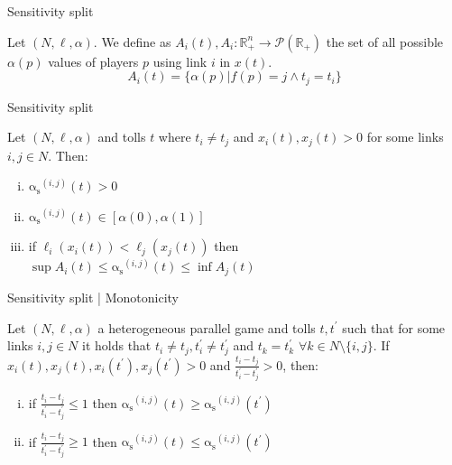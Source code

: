 \documentclass{beamer}
\newcommand{\as}{\mathrm{\alpha_s}}
\newcommand{\R}{\mathbb{R}}
\begin{document}
\begin{frame}{Sensitivity split}
	\begin{definition}
		\label{definition:alpha_flow_sets}
		Let $(N, \ell, \alpha)$.
		We define as $A_i(t), A_i: \R_+^n \rightarrow \mathcal{P}(\R_+)$ the set of all possible $\alpha(p)$ values of players $p$ using link $i$ in $x(t)$.
		\[A_i(t) = \{\alpha(p) | f(p) = j \wedge t_j = t_i\}\]
	\end{definition}
\end{frame}

\begin{frame}{Sensitivity split}
	\begin{lemma}
		Let $(N, \ell, \alpha)$ and tolls $t$ where $t_i \ne t_j$ and $x_i(t), x_j(t) > 0$ for some links $i, j \in N$.
		Then:
		\begin{enumerate}[(i)]
			\item $\as^{(i, j)}(t) > 0$
			\item $\as^{(i, j)}(t) \in [\alpha(0), \alpha(1)]$
			\item if $\ell_i(x_i(t)) < \ell_j(x_j(t))$ then
			$\sup A_i(t) \le \as^{(i, j)}(t) \le \inf A_j(t)$
		\end{enumerate}
	\end{lemma}
\end{frame}

\begin{frame}{Sensitivity split | Monotonicity}
	\begin{lemma}
		Let $(N, \ell, \alpha)$ a heterogeneous parallel game and tolls $t, t^\prime$ such that for some links $i, j \in N$ it holds that $t_i \ne t_j, t_i^\prime \ne t_j^\prime$ and $t_k = t_k^\prime$ $\forall k \in N \setminus \{i, j\}$.
		If $x_i(t), x_j(t), x_i(t^\prime), x_j(t^\prime) > 0$ and $\frac{t_i - t_j}{t_i^\prime - t_j^\prime} > 0$, then:
		\begin{enumerate}[(i)]
			\item if $\frac{t_i - t_j}{t_i^\prime - t_j^\prime} \le 1$ then $\as^{(i, j)}(t) \ge \as^{(i, j)}(t^\prime)$
			\item if $\frac{t_i - t_j}{t_i^\prime - t_j^\prime} \ge 1$ then $\as^{(i, j)}(t) \le \as^{(i, j)}(t^\prime)$
		\end{enumerate}
	\end{lemma}
\end{frame}
\end{document}
